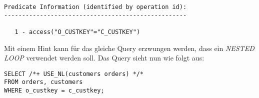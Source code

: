 \documentclass[11pt,a4paper,parskip=half]{scrartcl}
\begin{document}
\begin{lstlisting}
Predicate Information (identified by operation id):                                                                                                                                                                                                                                                          
---------------------------------------------------                                                                                                                                                                                                                                                          
                                                                                                                                                                                                                                                                                                             
   1 - access("O_CUSTKEY"="C_CUSTKEY")                                                                                                                                                                                                                                                                       
\end{lstlisting}

Mit einem Hint kann für das gleiche Query erzwungen werden, dass ein \emph{NESTED LOOP} verwendet werden soll. Das Query sieht nun wie folgt aus:
\begin{lstlisting}
SELECT /*+ USE_NL(customers orders) */* 
FROM orders, customers
WHERE o_custkey = c_custkey;
\end{lstlisting}
\end{document}
